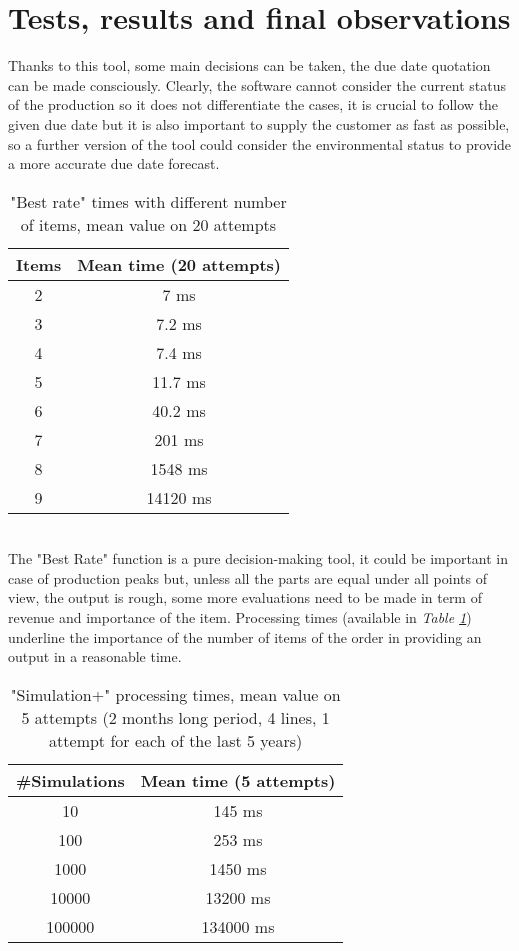 \documentclass[a4paper,12pt]{article}
\begin{document}
\newpage
\section{Tests, results and final observations}
Thanks to this tool, some main decisions can be taken, the due date quotation can be made consciously. Clearly, the software cannot consider the current status of the production so it does not differentiate the cases, it is crucial to follow the given due date but it is also important to supply the customer as fast as possible, so a further version of the tool could consider the environmental status to provide a more accurate due date forecast. \\
\begin{table}[htb]
\centering
\begin{tabular}{|c|c|}
\hline
Items & Mean time (20 attempts) \\ \hline
2 & 7 ms \\ \hline
3 & 7.2 ms \\ \hline
4 & 7.4 ms \\ \hline
5 & 11.7 ms \\ \hline
6 & 40.2 ms \\ \hline
7 & 201 ms \\ \hline
8 & 1548 ms \\ \hline
9 & 14120 ms \\ \hline
\end{tabular}
\caption{"Best rate" times with different number of items, mean value on 20 attempts}
\label{tab:best-rate}
\end{table}\\
The "Best Rate" function is a pure decision-making tool, it could be important in case of production peaks but, unless all the parts are equal under all points of view, the output is rough, some more evaluations need to be made in term of revenue and importance of the item. Processing times (available in \textit{Table \ref{tab:best-rate}}) underline the importance of the number of items of the order in providing an output in a reasonable time. \\
\begin{table}[htb]
\centering
\begin{tabular}{|c|c|}
\hline
\#Simulations & Mean time (5 attempts) \\ \hline
10 & 145 ms \\ \hline
100 & 253 ms \\ \hline
1000 & 1450 ms \\ \hline
10000 & 13200 ms \\ \hline
100000 & 134000 ms \\ \hline
\end{tabular}
\caption{"Simulation+" processing times, mean value on 5 attempts (2 months long period, 4 lines, 1 attempt for each of the last 5 years)}
\label{tab:simulation-plus}
\end{table}\\
\end{document}

